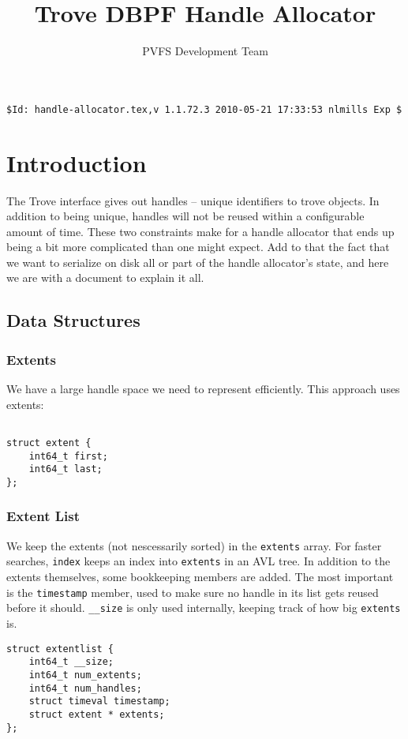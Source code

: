 \documentclass[10pt]{article} %
\title{Trove DBPF Handle Allocator }
\author{PVFS Development Team}
\begin{document}
\maketitle
\begin{verbatim}$Id: handle-allocator.tex,v 1.1.72.3 2010-05-21 17:33:53 nlmills Exp $\end{verbatim}

\section{Introduction}

The Trove interface gives out handles -- unique identifiers to trove
objects.  In addition to being unique, handles will not be reused within
a configurable amount of time.  These two constraints make for a handle
allocator that ends up being a bit more complicated than one might
expect.  Add to that the fact that we want to serialize on disk all or
part of the handle allocator's state, and here we are with a document to
explain it all.

\subsection{Data Structures}
\subsubsection{Extents}
We have a large handle space we need to represent efficiently.  This
approach uses extents:
\begin{verbatim}

struct extent {
	int64_t first;
	int64_t last;
};

\end{verbatim}

\subsubsection{Extent List}
We keep the extents (not nescessarily sorted) in the \texttt{extents}
array.  For faster searches, \texttt{index} keeps an index into
\texttt{extents} in an AVL tree. 
In addition
to the extents themselves, some bookkeeping members are added.  The most
important is the \texttt{timestamp} member, used to make sure no handle in
its list gets reused before it should.  \texttt{\_\_size} is only used
internally, keeping track of how big \texttt{extents} is.  

\begin{verbatim}
struct extentlist {
	int64_t __size;
	int64_t num_extents;
	int64_t num_handles;
	struct timeval timestamp;
	struct extent * extents;
};
\end{verbatim}
\end{document}
